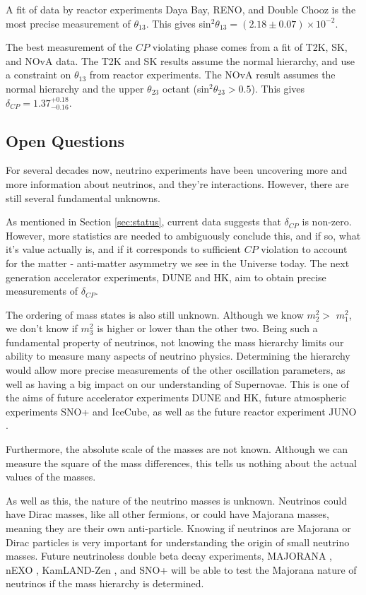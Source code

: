 A fit of data by reactor experiments Daya Bay, RENO, and Double Chooz is the most precise measurement of $\theta_{13}$. This gives sin$^2 \theta_{13} = (2.18\pm0.07) \times 10^{-2}$.

The best measurement of the $CP$ violating phase comes from a fit of T2K, SK, and NOvA data. The T2K and SK results assume the normal hierarchy, and use a constraint on $\theta_{13}$ from reactor experiments. The NOvA result assumes the normal hierarchy and the upper $\theta_{23}$ octant (sin$^2 \theta_{23} > 0.5$). This gives $\delta_{CP} = 1.37^{+0.18}_{−0.16}$.

\subsection{Open Questions}

For several decades now, neutrino experiments have been uncovering more and more information about neutrinos, and they're interactions. However, there are still several fundamental unknowns. 

As mentioned in Section \ref{sec:status}, current data suggests that $\delta_{CP}$ is non-zero. However, more statistics are needed to ambiguously conclude this, and if so, what it's value actually is, and if it corresponds to sufficient $CP$ violation to account for the matter - anti-matter asymmetry we see in the Universe today. The next generation accelerator experiments, DUNE and HK, aim to obtain precise measurements of $\delta_{CP}$.

The ordering of mass states is also still unknown. Although we know $m_{2}^2 >$ $m_{1}^2$, we don't know if $m_3^2$ is higher or lower than the other two. Being such a fundamental property of neutrinos, not knowing the mass hierarchy limits our ability to measure many aspects of neutrino physics. Determining the hierarchy would allow more precise measurements of the other oscillation parameters, as well as having a big impact on our understanding of Supernovae. This is one of the aims of future accelerator experiments DUNE and HK, future atmospheric experiments SNO+ and IceCube, as well as the future reactor experiment JUNO \cite{juno}.

Furthermore, the absolute scale of the masses are not known. Although we can measure the square of the mass differences, this tells us nothing about the actual values of the masses.

As well as this, the nature of the neutrino masses is unknown. Neutrinos could have Dirac masses, like all other fermions, or could have Majorana masses, meaning they are their own anti-particle. Knowing if neutrinos are Majorana or Dirac particles is very important for understanding the origin of small neutrino masses. Future neutrinoless double beta decay experiments, MAJORANA \cite{2011majorana}, nEXO \cite{nexo}, KamLAND-Zen \cite{kamlandzen}, and SNO+ will be able to test the Majorana nature of neutrinos if the mass hierarchy is determined.

